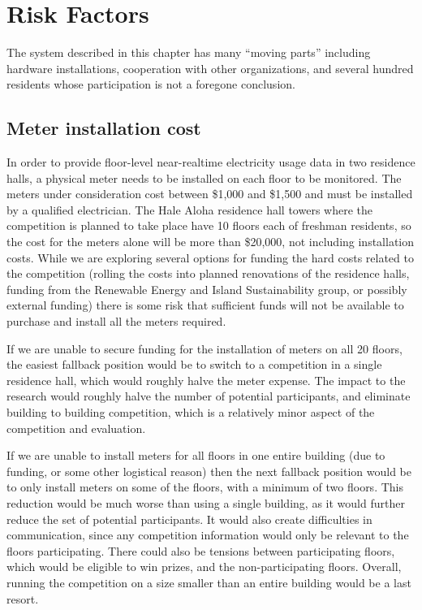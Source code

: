 \section{Risk Factors}

The system described in this chapter has many ``moving parts'' including hardware installations, cooperation with other organizations, and several hundred residents whose participation is not a foregone conclusion.

\subsection{Meter installation cost}

In order to provide floor-level near-realtime electricity usage data in two residence halls, a physical meter needs to be installed on each floor to be monitored. The meters under consideration cost between \$1,000 and \$1,500 and must be installed by a qualified electrician. The Hale Aloha residence hall towers where the competition is planned to take place have 10 floors each of freshman residents, so the cost for the meters alone will be more than \$20,000, not including installation costs. While we are exploring several options for funding the hard costs related to the competition (rolling the costs into planned renovations of the residence halls, funding from the Renewable Energy and Island Sustainability group, or possibly external funding) there is some risk that sufficient funds will not be available to purchase and install all the meters required.

If we are unable to secure funding for the installation of meters on all 20 floors, the easiest fallback position would be to switch to a competition in a single residence hall, which would roughly halve the meter expense. The impact to the research would roughly halve the number of potential participants, and eliminate building to building competition, which is a relatively minor aspect of the competition and evaluation.

If we are unable to install meters for all floors in one entire building (due to funding, or some other logistical reason) then the next fallback position would be to only install meters on some of the floors, with a minimum of two floors. This reduction would be much worse than using a single building, as it would further reduce the set of potential participants. It would also create difficulties in communication, since any competition information would only be relevant to the floors participating. There could also be tensions between participating floors, which would be eligible to win prizes, and the non-participating floors. Overall, running the competition on a size smaller than an entire building would be a last resort.

